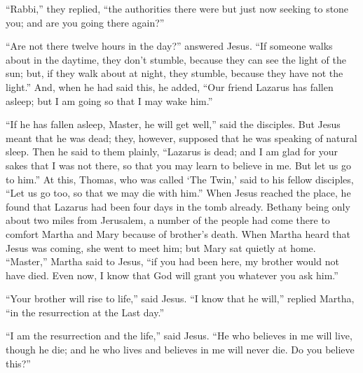  ``Rabbi,'' they replied, ``the authorities there were but
just now seeking to stone you; and are you going there again?''

 ``Are not there twelve hours in the day?'' answered Jesus.
``If someone walks about in the daytime, they don't stumble, because
they can see the light of the sun;  but, if they walk about
at night, they stumble, because they have not the light.'' 
And, when he had said this, he added, ``Our friend Lazarus has fallen
asleep; but I am going so that I may wake him.''

 ``If he has fallen asleep, Master, he will get well,''
said the disciples.  But Jesus meant that he was dead;
they, however, supposed that he was speaking of natural sleep.
 Then he said to them plainly, ``Lazarus is dead;
 and I am glad for your sakes that I was not there, so that
you may learn to believe in me. But let us go to him.''  At
this, Thomas, who was called `The Twin,' said to his fellow disciples,
``Let us go too, so that we may die with him.''  When Jesus
reached the place, he found that Lazarus had been four days in the tomb
already.  Bethany being only about two miles from
Jerusalem,  a number of the people had come there to
comfort Martha and Mary because of brother's death.  When
Martha heard that Jesus was coming, she went to meet him; but Mary sat
quietly at home.  ``Master,'' Martha said to Jesus, ``if
you had been here, my brother would not have died.  Even
now, I know that God will grant you whatever you ask him.''

 ``Your brother will rise to life,'' said Jesus.
 ``I know that he will,'' replied Martha, ``in the
resurrection at the Last day.''

 ``I am the resurrection and the life,'' said Jesus. ``He
who believes in me will live, though he die;  and he who
lives and believes in me will never die. Do you believe this?''

